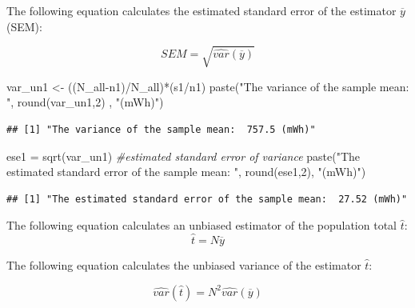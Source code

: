 \documentclass[
]{book}
\newenvironment{Shaded}{\begin{snugshade}}{\end{snugshade}}
\newcommand{\CommentTok}[1]{\textcolor[rgb]{0.56,0.35,0.01}{\textit{#1}}}
\newcommand{\DecValTok}[1]{\textcolor[rgb]{0.00,0.00,0.81}{#1}}
\newcommand{\FunctionTok}[1]{\textcolor[rgb]{0.00,0.00,0.00}{#1}}
\newcommand{\NormalTok}[1]{#1}
\newcommand{\OtherTok}[1]{\textcolor[rgb]{0.56,0.35,0.01}{#1}}
\newcommand{\SpecialCharTok}[1]{\textcolor[rgb]{0.00,0.00,0.00}{#1}}
\newcommand{\StringTok}[1]{\textcolor[rgb]{0.31,0.60,0.02}{#1}}
\begin{document}
The following equation calculates the estimated standard error of the estimator \(\overline{y}\) (SEM):

\begin{equation} 
  SEM = \sqrt{\hat{var}(\overline{y})} \label{eq:se}
\end{equation}

\begin{Shaded}
\begin{Highlighting}[]
\NormalTok{var\_un1 }\OtherTok{\textless{}{-}}\NormalTok{ ((N\_all}\SpecialCharTok{{-}}\NormalTok{n1)}\SpecialCharTok{/}\NormalTok{N\_all)}\SpecialCharTok{*}\NormalTok{(s1}\SpecialCharTok{/}\NormalTok{n1)}
\FunctionTok{paste}\NormalTok{(}\StringTok{"The variance of the sample mean: "}\NormalTok{, }\FunctionTok{round}\NormalTok{(var\_un1,}\DecValTok{2}\NormalTok{) , }\StringTok{"(mWh)"}\NormalTok{)}
\end{Highlighting}
\end{Shaded}

\begin{verbatim}
## [1] "The variance of the sample mean:  757.5 (mWh)"
\end{verbatim}

\begin{Shaded}
\begin{Highlighting}[]
\NormalTok{ese1 }\OtherTok{=} \FunctionTok{sqrt}\NormalTok{(var\_un1) }\CommentTok{\#estimated standard error of variance}
\FunctionTok{paste}\NormalTok{(}\StringTok{"The estimated standard error of the sample mean: "}\NormalTok{, }\FunctionTok{round}\NormalTok{(ese1,}\DecValTok{2}\NormalTok{), }\StringTok{"(mWh)"}\NormalTok{)}
\end{Highlighting}
\end{Shaded}

\begin{verbatim}
## [1] "The estimated standard error of the sample mean:  27.52 (mWh)"
\end{verbatim}

The following equation calculates an unbiased estimator of the population total \(\hat{t}\):
\begin{equation} 
  \hat{t} = N{\overline{y}} \label{eq:t}
\end{equation}

The following equation calculates the unbiased variance of the estimator \(\hat{t}\):

\begin{equation} 
  \hat{var}(\hat{t})= N^2\hat{var}(\overline{y}) \label{eq:tv}
\end{equation}
\end{document}
